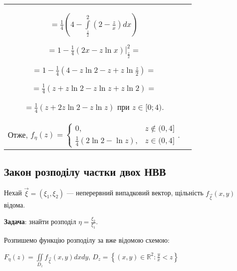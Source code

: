 \begin{example}
\begin{tabular}{c p{8.5 cm}}
            $=\frac{1}{4}\left(4 - \int\limits_{\frac{z}{2}}^2 
            \left(2 -\frac{z}{x}\right)dx\right) $

            $= 1 - \frac{1}{4}\left.(2x - z \ln x)\right|_{\frac{z}{2}}^2 = $
            
            $= 1 - \frac{1}{4}(4 - z\ln2 - z + z\ln\frac{z}{2}) =$

            $= \frac{1}{4}(z + z\ln2 - z\ln z + z\ln2) = $

            $= \frac{1}{4}(z + 2z\ln2 - z\ln z)$ 
            при $z\in [0; 4)$. \\
            Отже, $f_{\eta}(z) = 
            \begin{cases}
                0, & z \notin (0, 4] \\
                \frac{1}{4}(2\ln2 - \ln z), & z \in (0, 4]
            \end{cases}$.
        \end{tabular}
\end{example}

\subsection{Закон розподілу частки двох НВВ}

Нехай $\vec{\xi} = (\xi_1, \xi_2)$ --- неперервний випадковий вектор, щільність
$f_{\vec{\xi}}(x, y)$ відома.

\noindent\textbf{Задача}: знайти розподіл $\eta = \frac{\xi_2}{\xi_1}$.

Розпишемо функцію розподілу за вже відомою схемою:

$F_\eta(z) = \iint\limits_{D_z}f_{\vec{\xi}}(x, y)dxdy$, $D_z = \left\{(x, y) \in 
\mathbb{R}^2 : \frac{y}{x} < z\right\}$

